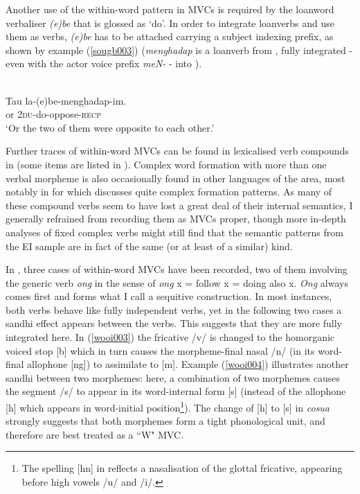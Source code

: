 Another use of the within-word pattern in  MVCs is required by the loanword verbaliser \textit{(e)be} that is glossed as `do'. In order to integrate loanverbs and use them as verbs, \textit{(e)be} has to be attached carrying a subject indexing prefix, as shown by example (\ref{sougb003}) (\textit{menghadap} is a loanverb from , fully integrated - even with the actor voice prefix \textit{meN-} - into ).

\ea \label{sougb003}
\\
\gll Tau la-(e)be-menghadap-im. \\
or 2\textsc{du}-do-oppose-\textsc{recp} \\
\glft `Or the two of them were opposite to each other.'\\
\z

Further traces of within-word MVCs can be found in lexicalised verb compounds in  (some items are listed in \citealt[216]{reesink2002grammar}). Complex word formation with more than one verbal morpheme is also occasionally found in other languages of the area, most notably in  for which \citet{kratochvil2007grammar} discusses quite complex formation patterns. As many of these compound verbs seem to have lost a great deal of their internal semantics, I generally refrained from recording them as MVCs proper, though more in-depth analyses of fixed complex verbs might still find that the semantic patterns from the EI sample are in fact of the same (or at least of a similar) kind.

In , three cases of within-word MVCs have been recorded, two of them involving the generic verb \textit{ong} in the sense of \textit{ong} x = follow x = doing also x. \textit{Ong} always comes first and forms what I call a sequitive construction. In most instances, both verbs behave like fully independent verbs, yet in the following two cases a sandhi effect appears between the verbs. This suggests that they are more fully integrated here. In (\ref{wooi003}) the fricative /v/ is changed to the homorganic voiced stop [b] which in turn causes the morpheme-final nasal /n/ (in its word-final allophone [ng]) to assimilate to [m]. Example (\ref{wooi004}) illustrates another sandhi between two morphemes: here, a combination of two morphemes causes the segment /s/ to appear in its word-internal form [s] (instead of the allophone [h] which appears in word-initial position\footnote{The spelling [hn] in  reflects a nasalisation of the glottal fricative, appearing before high vowels /u/ and /i/.}). The change of [h] to [s] in \textit{cosua} strongly suggests that both morphemes form a tight phonological unit, and therefore are best treated as a ``W" MVC.

